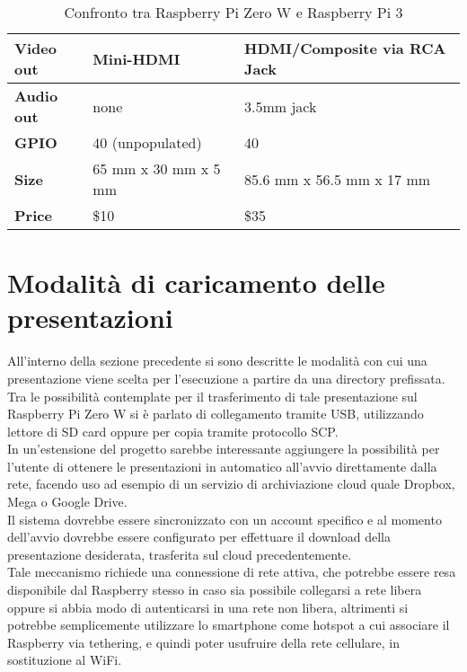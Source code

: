 \begin{table}[h]
\begin{tabular}{lll}
\multicolumn{1}{|l|}{\textbf{Video out}} & \multicolumn{1}{l|}{Mini-HDMI}            & \multicolumn{1}{l|}{HDMI/Composite via RCA Jack}           \\ \hline
\multicolumn{1}{|l|}{\textbf{Audio out}} & \multicolumn{1}{l|}{none}                 & \multicolumn{1}{l|}{3.5mm jack}                            \\ \hline
\multicolumn{1}{|l|}{\textbf{GPIO}}         & \multicolumn{1}{l|}{40 (unpopulated)}     & \multicolumn{1}{l|}{40}                                    \\ \hline
\multicolumn{1}{|l|}{\textbf{Size}}         & \multicolumn{1}{l|}{65 mm x 30 mm x 5 mm} & \multicolumn{1}{l|}{85.6 mm x 56.5 mm x 17 mm}             \\ \hline
\multicolumn{1}{|l|}{\textbf{Price}}        & \multicolumn{1}{l|}{\$10}                 & \multicolumn{1}{l|}{\$35}                                  \\ \hline                    

\end{tabular}
\caption{Confronto tra Raspberry Pi Zero W e Raspberry Pi 3}
\end{table}

\section{Modalità di caricamento delle presentazioni}
All'interno della sezione precedente si sono descritte le modalità con cui una presentazione viene scelta per l'esecuzione a partire da una directory prefissata. Tra le possibilità contemplate per il trasferimento di tale presentazione sul Raspberry Pi Zero W si è parlato di collegamento tramite USB, utilizzando lettore di SD card oppure per copia tramite protocollo SCP.\\
In un'estensione del progetto sarebbe interessante aggiungere la possibilità per l'utente di ottenere le presentazioni in automatico all'avvio direttamente dalla rete, facendo uso ad esempio di un servizio di archiviazione cloud quale Dropbox, Mega o Google Drive.\\ Il sistema dovrebbe essere sincronizzato con un account specifico e al momento dell'avvio dovrebbe essere configurato per effettuare il download della presentazione desiderata, trasferita sul cloud precedentemente.\\
Tale meccanismo richiede una connessione di rete attiva, che potrebbe essere resa disponibile dal Raspberry stesso in caso sia possibile collegarsi a rete libera oppure si abbia modo di autenticarsi in una rete non libera, altrimenti si potrebbe semplicemente utilizzare lo smartphone come hotspot a cui associare il Raspberry via tethering, e quindi poter usufruire della rete cellulare, in sostituzione al WiFi.

